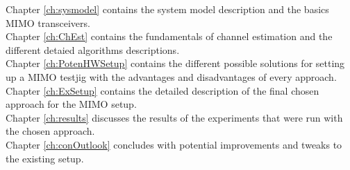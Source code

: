 Chapter \ref{ch:sysmodel} contains the system model description and the basics MIMO transceivers.\\
Chapter \ref{ch:ChEst} contains the fundamentals of channel estimation and the different detaied algorithms descriptions. \\
Chapter \ref{ch:PotenHWSetup} contains the different possible solutions for setting up a MIMO testjig with the advantages and disadvantages of every approach. \\
Chapter \ref{ch:ExSetup} contains the detailed description of the final chosen approach for the MIMO setup. \\
Chapter \ref{ch:results} discusses the results of the experiments that were run with the chosen approach. \\
Chapter \ref{ch:conOutlook} concludes with potential improvements and tweaks to the existing setup.
